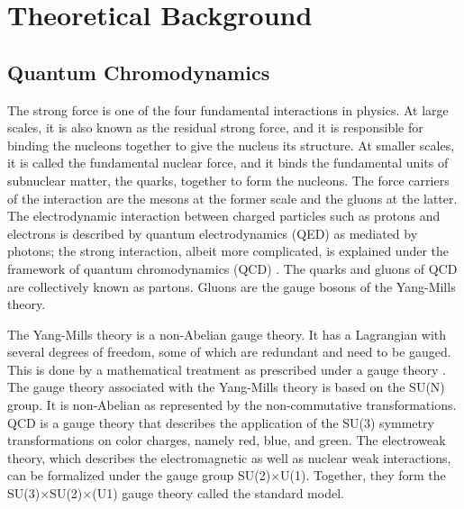 \chapter{Theoretical Background} \label{ch:background}




\section{Quantum Chromodynamics}\label{section:QCD}
The strong force is one of the four fundamental interactions in physics. At large scales, it is also known as the residual strong force, and it is responsible for binding the nucleons together to give the nucleus its structure. At smaller scales, it is called the fundamental nuclear force, and it binds the fundamental units of subnuclear matter, the quarks, together to form the nucleons. The force carriers of the interaction are the mesons at the former scale and the gluons at the latter. %
The electrodynamic interaction between charged particles such as protons and electrons is described by quantum electrodynamics (QED) as mediated by photons; the strong interaction, albeit more complicated, is explained under the framework of quantum chromodynamics (QCD) \cite{KAPUSTA1979461, Shuryak1988}. The quarks and gluons of QCD are collectively known as partons. Gluons are the gauge bosons of the Yang-Mills theory.

The Yang-Mills theory is a non-Abelian gauge theory. It has a Lagrangian with several degrees of freedom, some of which are redundant and need to be gauged. This is done by a mathematical treatment as prescribed under a gauge theory \cite{aitchison2003gauge}. The gauge theory associated with the Yang-Mills theory is based on the SU(N) group. It is non-Abelian as represented by the non-commutative transformations. QCD is a gauge theory that describes the application of the SU(3) symmetry transformations on color charges, namely red, blue, and green. The electroweak theory, which describes the electromagnetic as well as nuclear weak interactions, can be formalized under the gauge group SU(2)$\times$U(1). Together, they form the SU(3)$\times$SU(2)$\times$(U1) gauge theory called the standard model.

